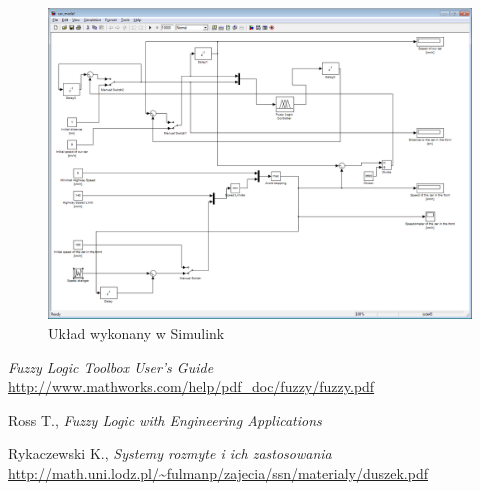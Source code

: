 \documentclass[11pt,a4paper]{article}
\begin{document}
\begin{figure}
\includegraphics[width=\textwidth]{simulink1.png}
\caption{Układ wykonany w Simulink} 
\label{img:simulink1}
\end{figure}

\begin{thebibliography}{9}
	\emph{Fuzzy Logic Toolbox User’s Guide}\\
	\url{http://www.mathworks.com/help/pdf_doc/fuzzy/fuzzy.pdf}

	Ross T., \emph{Fuzzy Logic with Engineering Applications}

	Rykaczewski K., \emph{Systemy rozmyte i ich zastosowania}\\
	\url{http://math.uni.lodz.pl/~fulmanp/zajecia/ssn/materialy/duszek.pdf}
\end{thebibliography}
\end{document}
